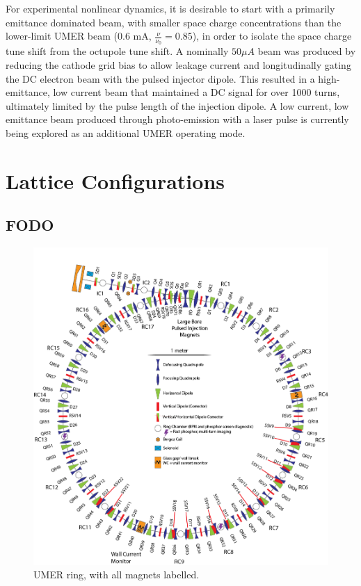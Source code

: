 	
For experimental nonlinear dynamics, it is desirable to start with a primarily emittance dominated beam, with smaller space charge concentrations than the lower-limit UMER beam (0.6 mA, $\frac{\nu}{\nu_0}=0.85$), in order to isolate the space charge tune shift from the octupole tune shift. 
A nominally $50 \mu A$ beam was produced by reducing the cathode grid bias to allow leakage current and longitudinally gating the DC electron beam with the pulsed injector dipole. 
This resulted in a high-emittance, low current beam that maintained a DC signal for over 1000 turns, ultimately limited by the pulse length of the injection dipole. 
A low current, low emittance beam produced through photo-emission with a laser pulse is currently being explored as an additional UMER operating mode. 
	
	
	
	
\section{Lattice Configurations}
\subsection{FODO}

\begin{figure}[]
   \centering
   \includegraphics[width=\textwidth]{umer-diagram/full_ring.png}
   \caption{UMER ring, with all magnets labelled.}
   \label{fig:umerring}
\end{figure}

